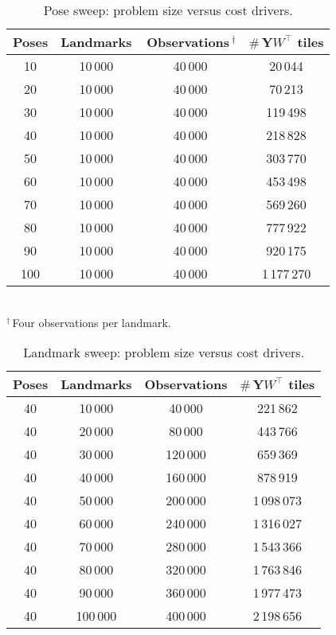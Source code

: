 \begin{table}[h]
  \caption{Pose sweep: problem size versus cost drivers.}
  \label{tab:synth_pose}
  \centering\footnotesize
  \begin{tabular}{@{}cccc@{}}
    \toprule
    Poses & Landmarks & $\,$Observations\,$^{\dagger}$ &
    $\#$\,Y$\!W^{\!\top}$ tiles\\
    \midrule
    10 & 10\,000 & 40\,000 & 20\,044\\
    20 & 10\,000 & 40\,000 & 70\,213\\
    30 & 10\,000 & 40\,000 & 119\,498\\
    40 & 10\,000 & 40\,000 & 218\,828\\
    50 & 10\,000 & 40\,000 & 303\,770\\
    60 & 10\,000 & 40\,000 & 453\,498\\
    70 & 10\,000 & 40\,000 & 569\,260\\
    80 & 10\,000 & 40\,000 & 777\,922\\
    90 & 10\,000 & 40\,000 & 920\,175\\
    100 & 10\,000 & 40\,000 & 1\,177\,270\\
    \bottomrule
  \end{tabular}
  \vspace{2pt}\\
  \footnotesize$^{\dagger}$\,Four observations per landmark.
\end{table}

\begin{table}[h]
  \caption{Landmark sweep: problem size versus cost drivers.}
  \label{tab:synth_lmk}
  \centering\footnotesize
  \begin{tabular}{@{}cccc@{}}
    \toprule
    Poses & Landmarks & Observations & $\#$\,Y$\!W^{\!\top}$ tiles\\
    \midrule
     40 & 10\,000 &  40\,000 &   221\,862\\
     40 & 20\,000 &  80\,000 &   443\,766\\
     40 & 30\,000 & 120\,000 &   659\,369\\
     40 & 40\,000 & 160\,000 &   878\,919\\
     40 & 50\,000 & 200\,000 & 1\,098\,073\\
     40 & 60\,000 & 240\,000 & 1\,316\,027\\
     40 & 70\,000 & 280\,000 & 1\,543\,366\\
     40 & 80\,000 & 320\,000 & 1\,763\,846\\
     40 & 90\,000 & 360\,000 & 1\,977\,473\\
     40 & 100\,000 & 400\,000 & 2\,198\,656\\
    \bottomrule
  \end{tabular}
\end{table}


